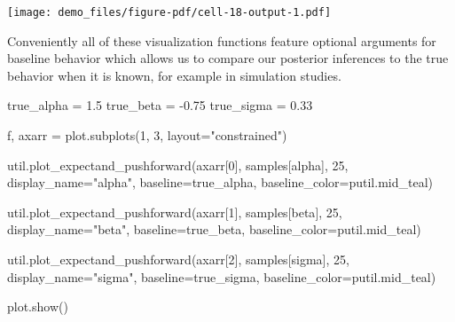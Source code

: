 \documentclass[
  letterpaper,
  DIV=11,
  numbers=noendperiod]{scrartcl}
\newenvironment{Shaded}{\begin{snugshade}}{\end{snugshade}}
\newcommand{\DecValTok}[1]{\textcolor[rgb]{0.68,0.00,0.00}{#1}}
\newcommand{\FloatTok}[1]{\textcolor[rgb]{0.68,0.00,0.00}{#1}}
\newcommand{\NormalTok}[1]{\textcolor[rgb]{0.00,0.23,0.31}{#1}}
\newcommand{\OperatorTok}[1]{\textcolor[rgb]{0.37,0.37,0.37}{#1}}
\newcommand{\StringTok}[1]{\textcolor[rgb]{0.13,0.47,0.30}{#1}}
\begin{document}
\texttt{[image: demo\_files/figure-pdf/cell-18-output-1.pdf]}

Conveniently all of these visualization functions feature optional
arguments for baseline behavior which allows us to compare our posterior
inferences to the true behavior when it is known, for example in
simulation studies.

\begin{Shaded}
\begin{Highlighting}[]
\NormalTok{true\_alpha }\OperatorTok{=} \FloatTok{1.5}
\NormalTok{true\_beta }\OperatorTok{=} \OperatorTok{{-}}\FloatTok{0.75}
\NormalTok{true\_sigma }\OperatorTok{=} \FloatTok{0.33}

\NormalTok{f, axarr }\OperatorTok{=}\NormalTok{ plot.subplots(}\DecValTok{1}\NormalTok{, }\DecValTok{3}\NormalTok{, layout}\OperatorTok{=}\StringTok{"constrained"}\NormalTok{)}

\NormalTok{util.plot\_expectand\_pushforward(axarr[}\DecValTok{0}\NormalTok{], samples[}\StringTok{\textquotesingle{}alpha\textquotesingle{}}\NormalTok{],}
                                \DecValTok{25}\NormalTok{, display\_name}\OperatorTok{=}\StringTok{"alpha"}\NormalTok{,}
\NormalTok{                                baseline}\OperatorTok{=}\NormalTok{true\_alpha,}
\NormalTok{                                baseline\_color}\OperatorTok{=}\NormalTok{putil.mid\_teal)}

\NormalTok{util.plot\_expectand\_pushforward(axarr[}\DecValTok{1}\NormalTok{], samples[}\StringTok{\textquotesingle{}beta\textquotesingle{}}\NormalTok{],}
                                \DecValTok{25}\NormalTok{, display\_name}\OperatorTok{=}\StringTok{"beta"}\NormalTok{,}
\NormalTok{                                baseline}\OperatorTok{=}\NormalTok{true\_beta,}
\NormalTok{                                baseline\_color}\OperatorTok{=}\NormalTok{putil.mid\_teal)}

\NormalTok{util.plot\_expectand\_pushforward(axarr[}\DecValTok{2}\NormalTok{], samples[}\StringTok{\textquotesingle{}sigma\textquotesingle{}}\NormalTok{],}
                                \DecValTok{25}\NormalTok{, display\_name}\OperatorTok{=}\StringTok{"sigma"}\NormalTok{,}
\NormalTok{                                baseline}\OperatorTok{=}\NormalTok{true\_sigma,}
\NormalTok{                                baseline\_color}\OperatorTok{=}\NormalTok{putil.mid\_teal)}

\NormalTok{plot.show()}
\end{Highlighting}
\end{Shaded}
\end{document}
